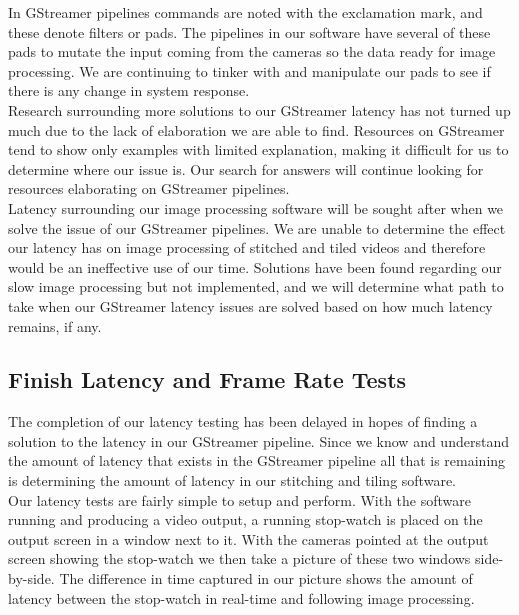 \documentclass[letterpaper,10pt,serif,draftclsnofoot,onecolumn,compsoc,titlepage]{IEEEtran}
\begin{document}
In GStreamer pipelines commands are noted with the exclamation mark, and these denote 
filters or pads. The pipelines in our software have several of these pads to mutate 
the input coming from the cameras so the data ready for image processing. We are continuing 
to tinker with and manipulate our pads to see if there is any change in system response. \\

Research surrounding more solutions to our GStreamer latency has not turned up much 
due to the lack of elaboration we are able to find. Resources on GStreamer tend to show 
only examples with limited explanation, making it difficult for us to determine where 
our issue is. Our search for answers will continue looking for resources elaborating on 
GStreamer pipelines. \\

Latency surrounding our image processing software will be sought after when we solve the 
issue of our GStreamer pipelines. We are unable to determine the effect our latency has 
on image processing of stitched and tiled videos and therefore would be an ineffective 
use of our time. Solutions have been found regarding our slow image processing but not 
implemented, and we will determine what path to take when our GStreamer latency issues 
are solved based on how much latency remains, if any. \\

\subsection{Finish Latency and Frame Rate Tests}

The completion of our latency testing has been delayed in hopes of finding a solution to 
the latency in our GStreamer pipeline. Since we know and understand the amount of latency 
that exists in the GStreamer pipeline all that is remaining is determining the amount of 
latency in our stitching and tiling software. \\

Our latency tests are fairly simple to setup and perform. With the software running and 
producing a video output, a running stop-watch is placed on the output screen in a window 
next to it. With the cameras pointed at the output screen showing the stop-watch we then 
take a picture of these two windows side-by-side. The difference in time captured in our 
picture shows the amount of latency between the stop-watch in real-time and following 
image processing. \\
\end{document}
